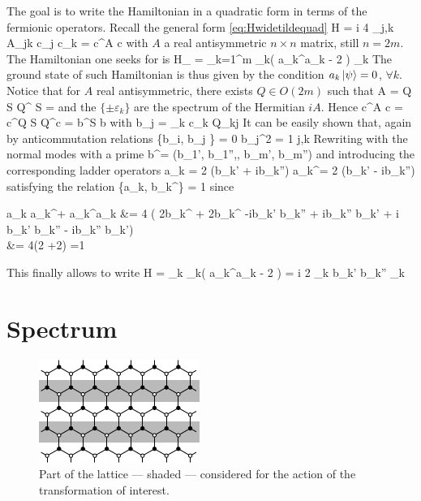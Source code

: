 		The goal is to write the Hamiltonian in a quadratic form in terms of the fermionic operators. Recall the general form \eqref{eq:Hwidetildequad}
		\be \mc H = \frac i 4 \sum_{j,k} A_{jk} c_j c_k = c^\top A c \ee
		with $A$ a real antisymmetric $n\times n$ matrix, still $n=2m$. The Hamiltonian one seeks for is
		\be \mc H_ = \sum_{k=1}^m \varepsilon_k\left( a_k^\dagger a_k - 2 \right) \quad \varepsilon_k  \ee
		The ground state of such Hamiltonian is thus given by the condition $a_k \ket \psi = 0$, $\forall k$.
		Notice that for $A$ real antisymmetric, there exists $Q\in O(2m)$ such that
		\be A = Q S Q^\top {} S =  \ee
		and the $\{\pm \varepsilon_k\}$ are the spectrum of the Hermitian $iA$. Hence 
		\be c^\top A c =  c^\top Q S Q^\top c = b^\top S b \ee
		with
		\be b_j = \sum_k c_k Q_{kj} \ee
		It can be easily shown that, again by anticommutation relations
		\be \{b_i, b_j \} = 0 \quad b_j^2 = 1 \quad \forall j,k \ee
		Rewriting with the normal modes with a prime
		\be b^\top = (b_1', b_1'',\dotsc, b_m', b_m'') \ee
		and introducing the corresponding ladder operators
		\be a_k =  2 (b_k' + ib_k'') \quad a_k^\dagger =  2 (b_k' - ib_k'') \ee
		satisfying the relation
		\be \{a_k, b_k^\dagger \} = 1 \ee
		since
		\be \begin{split} a_k a_k^\dagger + a_k^\dagger a_k &=  4 ( 2b_k^{} + 2b_k^{\prime {}} -ib_k' b_k'' + ib_k'' b_k' + i b_k' b_k'' - ib_k'' b_k') \\ &=  4(2 +2) =1 \end{split} \ee
		This finally allows to write 
		\be \mc H = \sum_k \varepsilon_k\left( a_k^\dagger a_k - 2 \right) = \frac i 2 \sum_k b_k' b_k'' \varepsilon_k \ee

	\section{Spectrum}

		\begin{figure}[h!]
            \centering
            \includegraphics[scale=0.8]{graphs/omegaShaded.png}
            \caption{Part of the lattice --- shaded --- considered for the action of the transformation of interest.}
            \label{fig:omegaShaded}
        \end{figure}

